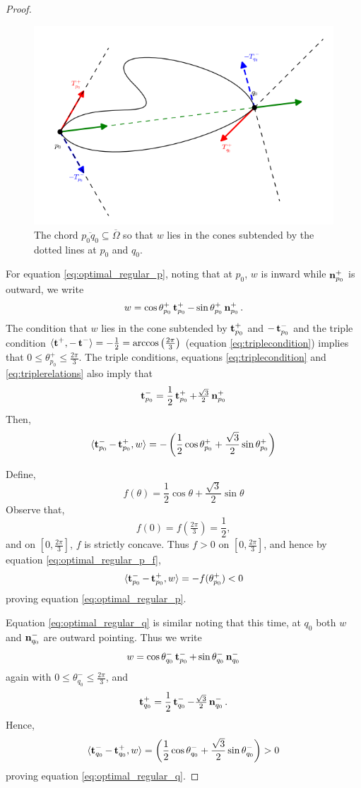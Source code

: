 \documentclass[11pt]{amsart}
\begin{document}
\begin{proof}
\begin{figure}[htb]
\centering
\includegraphics[width=.9\linewidth]{optimal_smooth}
\caption{The chord $\overline{p_0q_0} \subseteq \overline{\Omega}$ so that $w$ lies in the cones subtended by the dotted lines at $p_0$ and $q_0$.}
\label{fg:optimal_smooth}
\end{figure}

For equation \eqref{eq:optimal_regular_p}, noting that at \(p_0\), \(w\) is inward while \(\operatorname{\mathbf{n}}_{p_0}^+\) is outward, we write
\[
w = \cos \theta_{p_0}^+ \operatorname{\mathbf{t}}_{p_0}^+ - \sin \theta_{p_0}^+ \operatorname{\mathbf{n}}^+_{p_0}.
\]
The condition that \(w\) lies in the cone subtended by \(\operatorname{\mathbf{t}}_{p_0}^+\) and \(-\operatorname{\mathbf{t}}_{p_0}^-\) and the triple condition $\langle{\operatorname{\mathbf{t}}^+},{-\operatorname{\mathbf{t}}^-}\rangle = -\tfrac{1}{2} = \arccos\left(\tfrac{2\pi}{3}\right)$ (equation \eqref{eq:triplecondition}) implies that $0 \leq \theta^+_{p_0} \leq \tfrac{2\pi}{3}$. The triple conditions, equations \eqref{eq:triplecondition} and \eqref{eq:triplerelations} also imply that
\[
\operatorname{\mathbf{t}}_{p_0}^- = \frac{1}{2} \operatorname{\mathbf{t}}_{p_0}^+ + \tfrac{\sqrt{3}}{2} \operatorname{\mathbf{n}}_{p_0}^+
\]
Then,
\begin{equation}
\label{eq:optimal_regular_p_f}
\langle{\operatorname{\mathbf{t}}_{p_0}^- - \operatorname{\mathbf{t}}_{p_0}^+},{w}\rangle = - \left(\frac{1}{2} \cos \theta_{p_0}^+ + \frac{\sqrt{3}}{2} \sin \theta_{p_0}^+\right)
\end{equation}

Define,
\[
f(\theta) = \frac{1}{2} \cos \theta + \frac{\sqrt{3}}{2} \sin\theta
\]
Observe that,
\[
f(0) = f \left(\tfrac{2\pi}{3}\right) = \frac{1}{2},
\]
and on $[0, \tfrac{2\pi}{3}]$, $f$ is strictly concave. Thus $f > 0$ on $[0, \tfrac{2\pi}{3}]$, and hence by equation \eqref{eq:optimal_regular_p_f},
\[
\langle{\operatorname{\mathbf{t}}_{p_0}^- - \operatorname{\mathbf{t}}_{p_0}^+},{w}\rangle = - f (\theta_{p_0}^+) < 0
\]
proving equation \eqref{eq:optimal_regular_p}.

Equation \eqref{eq:optimal_regular_q} is similar noting that this time, at \(q_0\) both \(w\) and \(\operatorname{\mathbf{n}}_{q_0}^-\) are  outward pointing. Thus we write
\[
w = \cos \theta_{q_0}^- \operatorname{\mathbf{t}}_{p_0}^- + \sin \theta_{q_0}^- \operatorname{\mathbf{n}}^-_{q_0}
\]
again with $0 \leq \theta^-_{q_0} \leq \tfrac{2\pi}{3}$, and
\[
\operatorname{\mathbf{t}}_{q_0}^+ = \frac{1}{2} \operatorname{\mathbf{t}}_{q_0}^- - \tfrac{\sqrt{3}}{2} \operatorname{\mathbf{n}}_{q_0}^-.
\]
Hence,
\[
\langle{\operatorname{\mathbf{t}}_{q_0}^- - \operatorname{\mathbf{t}}_{q_0}^+},{w}\rangle = \left(\frac{1}{2} \cos \theta_{q_0}^- + \frac{\sqrt{3}}{2} \sin \theta_{q_0}^-\right) > 0
\]
proving equation \eqref{eq:optimal_regular_q}.
\end{proof}
\end{document}

